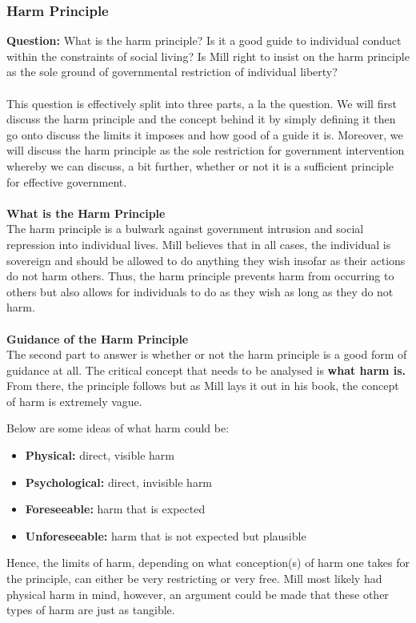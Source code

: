 \documentclass[12pt, letterpaper]{article}
\begin{document}
\subsubsection{Harm Principle}
\textbf{Question:} What is the harm principle? Is it a good guide to individual conduct within the constraints of social living? Is Mill right to insist on the harm principle as the sole ground of governmental restriction of individual liberty?
\\\\
This question is effectively split into three parts, a la the question. We will first discuss the harm principle and the concept behind it by simply defining it then go onto discuss the limits it imposes and how good of a guide it is. Moreover, we will discuss the harm principle as the sole restriction for government intervention whereby we can discuss, a bit further, whether or not it is a sufficient principle for effective government.
\\\\
\textbf{What is the Harm Principle}\\
The harm principle is a bulwark against government intrusion and social repression into individual lives. Mill believes that in all cases, the individual is sovereign and should be allowed to do anything they wish insofar as their actions do not harm others. Thus, the harm principle prevents harm from occurring to others but also allows for individuals to do as they wish as long as they do not harm.
\\\\
\textbf{Guidance of the Harm Principle}\\
The second part to answer is whether or not the harm principle is a good form of guidance at all. The critical concept that needs to be analysed is \textbf{what harm is.} From there, the principle follows but as Mill lays it out in his book, the concept of harm is extremely vague.

Below are some ideas of what harm could be:
\begin{itemize}
	\item \textbf{Physical:} direct, visible harm
	\item \textbf{Psychological:} direct, invisible harm
	\item \textbf{Foreseeable:} harm that is expected
	\item \textbf{Unforeseeable:} harm that is not expected but plausible
\end{itemize}
Hence, the limits of harm, depending on what conception(s) of harm one takes for the principle, can either be very restricting or very free. Mill most likely had physical harm in mind, however, an argument could be made that these other types of harm are just as tangible.
\end{document}
